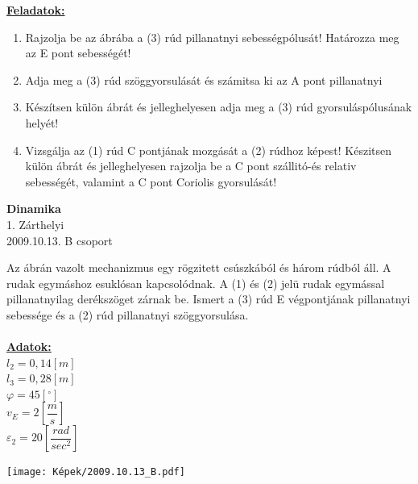 \documentclass[11pt,a4paper]{article}
\begin{document}
\vspace{2em}
\underline{\textbf{Feladatok:}}
\begin{enumerate}
    \item Rajzolja be az ábrába a (3) rúd pillanatnyi sebességpólusát! Határozza meg az E pont
    sebességét!
    \item Adja meg a (3) rúd szöggyorsulását és számitsa ki az A pont pillanatnyi
    \item Készítsen külön ábrát és jelleghelyesen adja meg a (3) rúd gyorsuláspólusának helyét!
    \item Vizsgálja az (1) rúd C pontjának mozgását a (2) rúdhoz képest! Készitsen külön ábrát és
    jelleghelyesen rajzolja be a C pont szállitó-és relativ sebességét, valamint a C pont
    Coriolis gyorsulását!
\end{enumerate}


\newpage

\begin{center}
    \textbf{\LARGE{Dinamika}}\\
    1. Zárthelyi\\
    2009.10.13. B csoport
\end{center}
Az ábrán vazolt mechanizmus egy rögzitett csúszkából és három rúdból áll. A rudak egymáshoz
esuklósan kapcsolódnak. A (1) és (2) jelü rudak egymással pillanatnyilag derékszöget zárnak be.
Ismert a (3) rúd E végpontjának pillanatnyi sebessége és a (2) rúd pillanatnyi szöggyorsulása.\\\\
\underline{\textbf{Adatok:}}\\
$l_2 = 0,14 [m]$\\
$l_3 = 0,28 [m]$\\
$\varphi = 45 [^\circ]$\\
$v_E = 2 \left[\dfrac{m}{s}\right]$\\
$\varepsilon_2 = 20 \left[\dfrac{rad}{sec^2}\right]$
\begin{center}
    \texttt{[image: Képek/2009.10.13\_B.pdf]}
\end{center}
\end{document}
